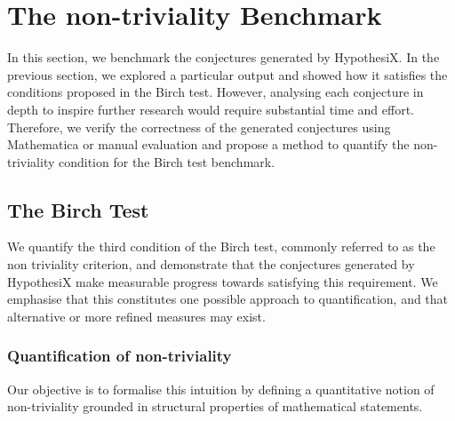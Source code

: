 \documentclass[11pt,reqno]{amsart}
\theoremstyle{plain}\newtheorem{theorem}{Theorem}[section]
\numberwithin{equation}{section}
\begin{document}
\section{The non-triviality Benchmark}\label{benchmark}
\noindent
In this section, we benchmark the conjectures generated by HypothesiX. In the previous section, we explored a particular output and showed how it satisfies the conditions proposed in the Birch test. However, analysing each conjecture in depth to inspire further research would require substantial time and effort. Therefore, we verify the correctness of the generated conjectures using Mathematica or manual evaluation and propose a method to quantify the non-triviality condition for the Birch test benchmark.

\subsection{The Birch Test} 

We quantify the third condition of the Birch test, commonly referred to as the non triviality criterion, and demonstrate that the conjectures generated by HypothesiX make measurable progress towards satisfying this requirement. We emphasise that this constitutes one possible approach to quantification, and that alternative or more refined measures may exist.

\subsubsection{Quantification of non-triviality}\label{nontriviality}
Our objective is to formalise this intuition by defining a quantitative notion of non-triviality grounded in structural properties of mathematical statements. 

\medskip
\end{document}
